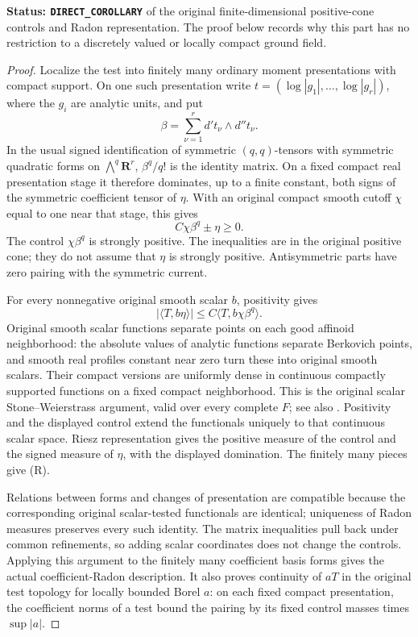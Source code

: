\documentclass[11pt,a4paper]{article}
\numberwithin{equation}{section}
\theoremstyle{definition}
\theoremstyle{remark}
\begin{document}
\noindent\textbf{Status: \texttt{DIRECT\_COROLLARY}} of the original
finite-dimensional positive-cone controls and Radon representation.
The proof below records why this part has no restriction to a
discretely valued or locally compact ground field.

\begin{proof}
Localize the test into finitely many ordinary moment presentations
with compact support.  On one such presentation write
$t=(\log|g_1|,\ldots,\log|g_r|)$, where the $g_i$ are analytic
units, and put
\[
 \beta=\sum_{\nu=1}^r d't_\nu\wedge d''t_\nu.
\]
In the usual signed identification of symmetric $(q,q)$-tensors
with symmetric quadratic forms on $\bigwedge^q\mathbf R^r$,
$\beta^q/q!$ is the identity matrix.  On a fixed compact real
presentation stage it therefore dominates, up to a finite
constant, both signs of the symmetric coefficient tensor of
$\eta$.  With an original compact smooth cutoff $\chi$ equal
to one near that stage, this gives
\[
 C\chi\beta^q\pm\eta\geq0.
\]
The control $\chi\beta^q$ is strongly positive.  The inequalities
are in the original positive cone; they do not assume that $\eta$
is strongly positive.  Antisymmetric parts have zero pairing
with the symmetric current.

For every nonnegative original smooth scalar $b$, positivity gives
\[
 |\langle T,b\eta\rangle|
       \leq C\langle T,b\chi\beta^q\rangle .
\]
Original smooth scalar functions separate points on each good
affinoid neighborhood: the absolute values of analytic functions
separate Berkovich points, and smooth real profiles constant near
zero turn these into original smooth scalars.  Their compact
versions are uniformly dense in continuous compactly supported
functions on a fixed compact neighborhood.  This is the original
scalar Stone--Weierstrass argument, valid over every complete $F$;
see also \cite[Propositions 15.2.6--15.2.9]{CLD25}.
Positivity and the displayed control extend the functionals
uniquely to that continuous scalar space.  Riesz representation
gives the positive measure of the control and the signed measure
of $\eta$, with the displayed domination.  The finitely many
pieces give (R).

Relations between forms and changes of presentation are compatible
because the corresponding original scalar-tested functionals
are identical; uniqueness of Radon measures preserves every such
identity.  The matrix inequalities pull back under common
refinements, so adding scalar coordinates does not change the
controls.  Applying this argument to the finitely many coefficient
basis forms gives the actual coefficient-Radon description.
It also proves continuity of $aT$ in the original test topology
for locally bounded Borel $a$: on each fixed compact presentation,
the coefficient norms of a test bound the pairing by its fixed
control masses times $\sup|a|$.


\end{proof}
\end{document}
